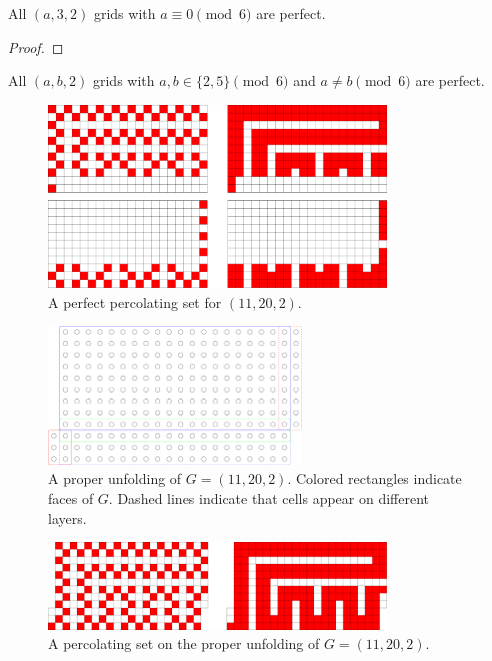 \begin{con}
All $(a,3,2)$ grids with $a \equiv 0 \pmod 6$ are perfect. 
\end{con}

\begin{proof}
\end{proof}


\begin{con}
All $(a,b,2)$ grids with $a,b \in \{2,5\} \pmod 6$ and $a \neq b \pmod 6$ are perfect. 
\end{con}

\begin{figure}[]
\centering
\includegraphics[width=0.8\textwidth]{figures/4/11x20x2.pdf}
\caption{A perfect percolating set for $(11,20,2)$.}
\label{fig:11x20x2}
\end{figure} 

\begin{figure}[]
\centering
\includegraphics[width=0.6\textwidth]{figures/4/11x20x2_manifold.pdf}
\caption{A proper unfolding of $G= (11,20,2)$. Colored rectangles indicate faces of $G$. Dashed lines indicate that cells appear on different layers. }
\label{fig:11x20x2_manifold}
\end{figure} 

\begin{figure}[]
\centering
\includegraphics[width=0.8\textwidth]{figures/4/11x20x2_unfolded_lethal.pdf}
\caption{A percolating set on the proper unfolding of $G= (11,20,2)$.}
\label{fig:11x20x2_unfolded_lethal}
\end{figure} 

